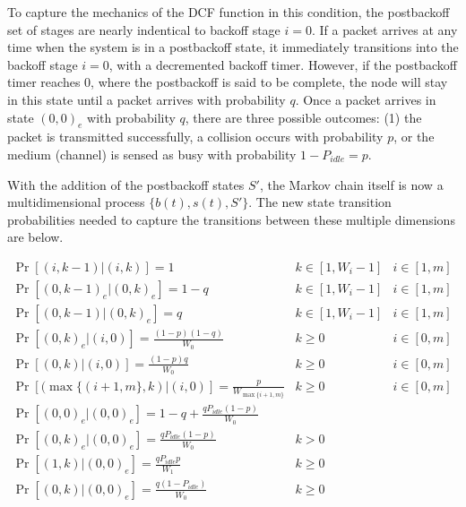 \documentclass{llncs}
\begin{document}
To capture the mechanics of the DCF function in this condition, the postbackoff set of stages are nearly indentical to backoff stage $i = 0$. If a packet arrives at any time when the system is in a postbackoff state, it immediately transitions into the backoff stage $i = 0$, with a decremented backoff timer. However, if the postbackoff timer reaches $0$, where the postbackoff is said to be complete, the node will stay in this state until a packet arrives with probability $q$. Once a packet arrives in state $(0, 0)_e$ with probability $q$, there are three possible outcomes: (1) the packet is transmitted successfully, a collision occurs with probability $p$, or the medium (channel) is sensed as busy with probability $1 - P_{idle} = p$. 

With the addition of the postbackoff states $S'$, the Markov chain itself is now a multidimensional process $\{b(t), s(t), S' \}$. The new state transition probabilities needed to capture the transitions between these multiple dimensions are below.

\begin{center}
\begin{math}
\boxed{
\begin{array}{lll}
\Pr[(i,k-1) | (i, k)] = 1 & k \in [1, W_i-1] & i \in [1,m] \\
\Pr[(0,k-1)_e | (0, k)_e] = 1-q & k \in [1, W_i-1] & i \in [1,m] \\
\Pr[(0,k-1) | (0, k)_e] = q & k \in [1, W_i-1] & i \in [1,m] \\
\Pr[(0,k)_e | (i, 0)] = \frac{(1-p)(1-q)}{W_0} & k \geq 0 & i \in [0,m] \\
\Pr[(0,k) | (i, 0)] = \frac{(1-p)q}{W_0} & k \geq 0 & i \in [0,m] \\
\Pr[(\max\{(i+1,m\}, k) | (i, 0)] = \frac{p}{W_{\max\{i+1,m\}}} & k \geq 0 & i \in [0,m] \\
\Pr[(0,0)_e | (0, 0)_e] = 1 - q + \frac{qP_{idle}(1 - p)}{W_0} & ~ \\
\Pr[(0,k)_e | (0, 0)_e] = \frac{qP_{idle}(1 - p)}{W_0} & k > 0 \\
\Pr[(1,k) | (0, 0)_e] = \frac{qP_{idle}p}{W_1} & k \geq 0 \\
\Pr[(0,k) | (0, 0)_e] = \frac{q(1 - P_{idle})}{W_0} & k \geq 0 \\
\end{array}
}
\end{math}
\end{center}
\end{document}
